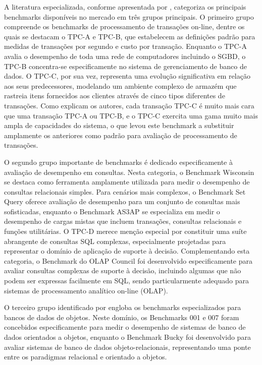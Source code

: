 A literatura especializada, conforme apresentada por , categoriza os principais benchmarks disponíveis no mercado em três grupos principais. O primeiro grupo compreende os benchmarks de processamento de transações on-line, dentre os quais se destacam o TPC-A e TPC-B, que estabelecem as definições padrão para medidas de transações por segundo e custo por transação. Enquanto o TPC-A avalia o desempenho de toda uma rede de computadores incluindo o SGBD, o TPC-B concentra-se especificamente no sistema de gerenciamento de banco de dados. O TPC-C, por sua vez, representa uma evolução significativa em relação aos seus predecessores, modelando um ambiente complexo de armazém que rastreia itens fornecidos aos clientes através de cinco tipos diferentes de transações. Como explicam os autores, cada transação TPC-C é muito mais cara que uma transação TPC-A ou TPC-B, e o TPC-C exercita uma gama muito mais ampla de capacidades do sistema, o que levou este benchmark a substituir amplamente os anteriores como padrão para avaliação de processamento de transações.

O segundo grupo importante de benchmarks é dedicado especificamente à avaliação de desempenho em consultas. Nesta categoria, o Benchmark Wisconsin se destaca como ferramenta amplamente utilizada para medir o desempenho de consultas relacionais simples. Para cenários mais complexos, o Benchmark Set Query oferece avaliação de desempenho para um conjunto de consultas mais sofisticadas, enquanto o Benchmark AS3AP se especializa em medir o desempenho de cargas mistas que incluem transações, consultas relacionais e funções utilitárias. O TPC-D merece menção especial por constituir uma suíte abrangente de consultas SQL complexas, especialmente projetadas para representar o domínio de aplicação de suporte à decisão. Complementando esta categoria, o Benchmark do OLAP Council foi desenvolvido especificamente para avaliar consultas complexas de suporte à decisão, incluindo algumas que não podem ser expressas facilmente em SQL, sendo particularmente adequado para sistemas de processamento analítico on-line (OLAP).

O terceiro grupo identificado por  engloba os benchmarks especializados para bancos de dados de objetos. Neste domínio, os Benchmarks 001 e 007 foram concebidos especificamente para medir o desempenho de sistemas de banco de dados orientados a objetos, enquanto o Benchmark Bucky foi desenvolvido para avaliar sistemas de banco de dados objeto-relacionais, representando uma ponte entre os paradigmas relacional e orientado a objetos.

